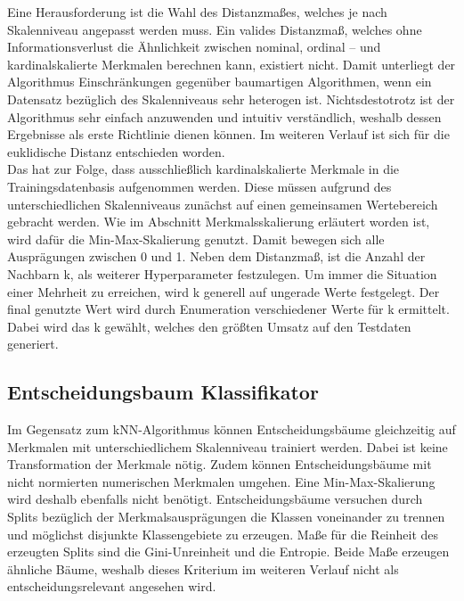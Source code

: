  Eine Herausforderung ist die Wahl des Distanzmaßes, welches je nach Skalenniveau angepasst werden muss. Ein valides Distanzmaß, welches ohne Informationsverlust die Ähnlichkeit zwischen nominal, ordinal – und kardinalskalierte Merkmalen berechnen kann, existiert nicht. Damit unterliegt der Algorithmus Einschränkungen gegenüber baumartigen Algorithmen, wenn ein Datensatz bezüglich des Skalenniveaus sehr heterogen ist. Nichtsdestotrotz ist der Algorithmus sehr einfach anzuwenden und intuitiv verständlich, weshalb dessen Ergebnisse als erste Richtlinie dienen können. Im weiteren Verlauf ist sich für die euklidische Distanz entschieden worden.\\

Das hat zur Folge, dass ausschließlich kardinalskalierte Merkmale in die Trainingsdatenbasis aufgenommen werden. Diese müssen aufgrund des unterschiedlichen Skalenniveaus zunächst auf einen gemeinsamen Wertebereich gebracht werden. Wie im Abschnitt Merkmalsskalierung erläutert worden ist, wird dafür die Min-Max-Skalierung genutzt. Damit bewegen sich alle Ausprägungen zwischen 0 und 1. Neben dem Distanzmaß, ist die Anzahl der Nachbarn k, als weiterer Hyperparameter festzulegen. Um immer die Situation einer Mehrheit zu erreichen, wird k generell auf ungerade Werte festgelegt. Der final genutzte Wert wird durch Enumeration verschiedener Werte für k ermittelt. Dabei wird das k gewählt, welches den größten Umsatz auf den Testdaten generiert.\\


\subsection{Entscheidungsbaum Klassifikator}
\label{sec:Tree}
Im Gegensatz zum kNN-Algorithmus können Entscheidungsbäume gleichzeitig auf Merkmalen mit unterschiedlichem Skalenniveau trainiert werden. Dabei ist keine Transformation der Merkmale nötig. Zudem können Entscheidungsbäume mit nicht normierten numerischen Merkmalen umgehen. Eine Min-Max-Skalierung wird deshalb ebenfalls nicht benötigt. Entscheidungsbäume versuchen durch Splits bezüglich der Merkmalsausprägungen die Klassen voneinander zu trennen und möglichst disjunkte Klassengebiete zu erzeugen. Maße für die Reinheit des erzeugten Splits sind die Gini-Unreinheit und die Entropie. Beide Maße erzeugen ähnliche Bäume, weshalb dieses Kriterium im weiteren Verlauf nicht als entscheidungsrelevant angesehen wird.\\

